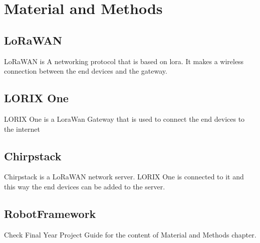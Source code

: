 
\chapter{Material and Methods} \label{ch:mat_met}
\section{LoRaWAN}
LoRaWAN is A networking protocol that is based on \gls{lora}. It makes a wireless connection between the end devices and the gateway.
\section{LORIX One}
LORIX One is a LoraWan Gateway that is used to connect the end devices to the internet
\section{Chirpstack}
    Chirpstack is a LoRaWAN network server. LORIX One is connected to it and this way the end devices can be added to the server.
\section{RobotFramework}



Check Final Year Project Guide for the content of Material and Methods chapter.

\clearpage %
